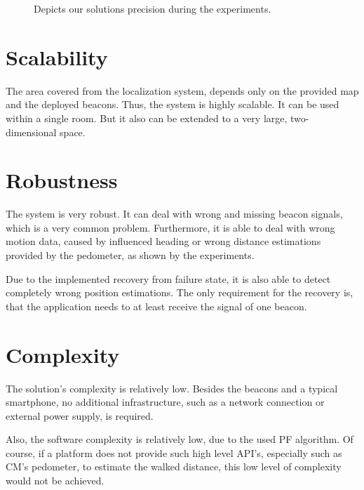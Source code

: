 
\begin{figure}
	
	\caption{Depicts our solutions precision during the experiments.}
	\label{fig:eval:precision}
\end{figure}



\section{Scalability}
The area covered from the localization system, depends only on the provided map and the deployed beacons. Thus, the system is highly scalable. It can be used within a single room. But it also can be extended to a very large, two-dimensional space.

\section{Robustness}
The system is very robust. It can deal with wrong and missing beacon signals, which is a very common problem. Furthermore, it is able to deal with wrong motion data, caused by influenced heading or wrong distance estimations provided by the pedometer, as shown by the experiments.

Due to the implemented recovery from failure state, it is also able to detect completely wrong position estimations. The only requirement for the recovery is, that the application needs to at least receive the signal of one beacon.

\section{Complexity}
The solution's complexity is relatively low. Besides the beacons and a typical smartphone, no additional infrastructure, such as a network connection or external power supply, is required.
	
Also, the software complexity is relatively low, due to the used \ac{PF} algorithm. Of course, if a platform does not provide such high level \acs{API}'s, especially such as \acl{CM}'s pedometer, to estimate the walked distance, this low level of complexity would not be achieved.

